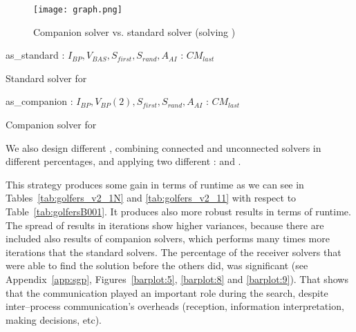 \begin{figure}
\centering
\texttt{[image: graph.png]} 
\caption{Companion solver vs. standard solver (solving \sgp)}
\label{fig:solversgolfers}
\end{figure}

\begin{algorithm}
\dontprintsemicolon
\SetNoline
{}
   as\_standard\;
\algoindent {} : $I_{BP}, V_{BAS}, S_{first}, S_{rand}, A_{AI}$ \;
\algoindent {} : $CM_{last}$ \;
\caption{Standard solver for \SGP}\label{as:golfers_full}
\end{algorithm}

\begin{algorithm}
\dontprintsemicolon
\SetNoline
{}
   as\_companion\;
\algoindent {} : $I_{BP}, V_{BP}(2), S_{first}, S_{rand}, A_{AI}$ \;
\algoindent {} : $CM_{last}$ \;
\caption{Companion solver for \SGP}\label{as:golfers_partial}
\end{algorithm}

We also design different \commstrs, combining connected and unconnected solvers in different percentages, and applying two different \commopers: \oneTone{} and \oneTn.

This strategy produces some gain in terms of runtime as we can see in Tables~\ref{tab:golfers_v2_1N} and \ref{tab:golfers_v2_11} with respect to Table~\ref{tab:golfersB001}. It produces also more robust results in terms of runtime. The spread of results in iterations show higher variances, because there are included also results of companion solvers, which performs many times more iterations that the standard solvers. The percentage of the receiver solvers that were able to find the solution before the others did, was significant (see Appendix~\ref{app:sgp}, Figures~\ref{barplot:5}, \ref{barplot:8} and \ref{barplot:9}). That shows that the communication played an important role during the search, despite inter--process communication's overheads (reception, information interpretation, making decisions, etc).

